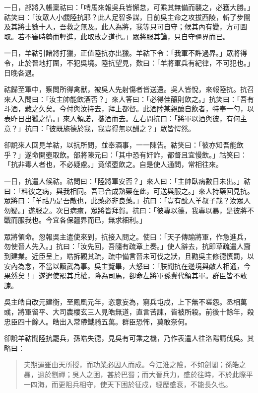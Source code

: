一日，部將入帳稟祜曰：「哨馬來報吳兵皆懈怠，可乘其無備而襲之，必獲大勝。」祜笑曰：「汝眾人小覷陸抗耶？此人足智多謀，日前吳主命之攻拔西陵，斬了步闡及其將士數十人，吾救之無及。此人為將，我等只可自守；候其內有變，方可圖取。若不審時勢而輕進，此取敗之道也。」眾將服其論，只自守疆界而已。

一日，羊祜引諸將打獵，正值陸抗亦出獵。羊祜下令：「我軍不許過界。」眾將得令，止於晉地打圍，不犯吳境。陸抗望見，歎曰：「羊將軍兵有紀律，不可犯也。」日晚各退。

祜歸至軍中，察問所得禽獸，被吳人先射傷者皆送還。吳人皆悅，來報陸抗。抗召來人入問曰：「汝主帥能飲酒否？」來人答曰：「必得佳釀則飲之。」抗笑曰：「吾有斗酒，藏之久矣。今付與汝持去，拜上都督。此酒陸某親釀自飲者，特奉一勺，以表昨日出獵之情。」來人領諾，攜酒而去。左右問抗曰：「將軍以酒與彼，有何主意？」抗曰：「彼既施德於我，我豈得無以酬之？」眾皆愕然。

卻說來人回見羊祜，以抗所問，並奉酒事，一一陳告。祜笑曰：「彼亦知吾能飲乎？」遂命開壺取飲。部將陳元曰：「其中恐有奸詐，都督且宜慢飲。」祜笑曰：「抗非毒人者也，不必疑慮。」竟傾壺飲之。自是使人通問，常相往來。

一日，抗遣人候祜。祜問曰：「陸將軍安否？」來人曰：「主帥臥病數日未出。」祜曰：「料彼之病，與我相同。吾已合成熟藥在此，可送與服之。」來人持藥回見抗。眾將曰：「羊祜乃是吾敵也，此藥必非良藥。」抗曰：「豈有酖人羊叔子哉？汝眾人勿疑。」遂服之。次日病癒，眾將皆拜賀。抗曰：「彼專以德，我專以暴，是彼將不戰而服我也。今宜各保疆界而已，無求細利。」

眾將領命。忽報吳主遣使來到，抗接入問之。使曰：「天子傳諭將軍，作急進兵，勿使晉人先入。」抗曰：「汝先回，吾隨有疏章上奏。」使人辭去，抗即草疏遣人齎到建業。近臣呈上，皓拆觀其疏，疏中備言晉未可伐之狀，且勸吳主修德慎罰，以安內為念，不當以黷武為事。吳主覽畢，大怒曰：「朕聞抗在邊境與敵人相通，今果然矣！」遂遣使罷其兵權，降為司馬，卻命左將軍孫冀代領其軍。群臣皆不敢諫。

吳主皓自改元建衡，至鳳凰元年，恣意妄為，窮兵屯戍，上下無不嗟怨。丞相萬彧，將軍留平、大司農樓玄三人見皓無道，直言苦諫，皆被所殺。前後十餘年，殺忠臣四十餘人。皓出入常帶鐵騎五萬。群臣恐怖，莫敢奈何。

卻說羊祜聞陸抗罷兵，孫皓失德，見吳有可乘之機，乃作表遣人往洛陽請伐吳。其略曰：

\begin{quote}
夫期運雖由天所授，而功業必因人而成。今江淮之險，不如劍閣；孫皓之暴，過於劉禪；吳人之困，甚於巴蜀；而大晉兵力，盛於往時，不於此際平一四海，而更阻兵相守，使天下困於征戍，經歷盛衰，不能長久也。
\end{quote}

